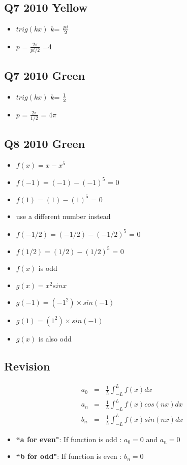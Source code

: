 \documentclass[11pt,a4paper,titlepage,oneside,openany]{article}
\numberwithin{equation}{section}
\numberwithin{algorithm}{section}
\numberwithin{figure}{section}
\numberwithin{table}{section}
\begin{document}
\subsection*{Q7 2010 Yellow}
\begin{itemize}
\item  $trig(kx)$ $k$= ${pi\over 2}$
\item  $p$ = $\frac{2\pi}{pi / 2}$ =4
\end{itemize}
\subsection*{Q7 2010 Green}
\begin{itemize}
\item  $trig(kx)$ $k$= ${1\over2}$
\item  $p$ = $\frac{2\pi}{1/2}$ = $4\pi$
\end{itemize}
\newpage
\subsection{Q8 2010 Green}
\begin{itemize}
\item $f(x) = x - x^5$
\item $f(-1) = (-1) - (-1)^5$ = 0
\item $f(1) = (1) - (1)^5$ = 0
\item use a different number instead
\item $f(-1/2) = (-1/2) - (-1/2)^5$ = 0
\item $f(1/2) = (1/2) - (1/2)^5$ = 0
\item $f(x)$ is odd

\item $g(x) = x^2 sin x$
\item $g(-1) = (-1^2) \times sin(-1)$
\item $g(1) = (1^2) \times sin(-1)$
\item $g(x)$ is also odd
\end{itemize}
\newpage
\subsection*{Revision}
\Large{

\begin{eqnarray}
a_0 &=& \frac{1}{L}\int^{L }_{-L} f(x) dx \\
a_n &=& \frac{1}{L}\int^{L }_{-L} f(x) cos(nx) dx \\ 
b_n &=& \frac{1}{L}\int^{L }_{-L} f(x) sin(nx) dx
\end{eqnarray}

\begin{itemize}
\item \textbf{ ``a for even"}: If function is odd : $a_0 = 0$ and $a_n=0$
\item \textbf{ ``b for odd"}: If function is even : $b_n=0$
\end{itemize}
}
\end{document}
